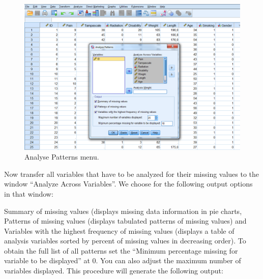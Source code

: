 \documentclass[]{book}
\theoremstyle{definition}
\theoremstyle{definition}
\theoremstyle{definition}
\theoremstyle{remark}
\begin{document}
\begin{figure}

{\centering \includegraphics[width=0.9\linewidth]{images/fig2.5} 

}

\caption{Analyse Patterns menu.}\label{fig:fig2-5}
\end{figure}

Now transfer all variables that have to be analyzed for their missing
values to the window ``Analyze Across Variables''. We choose for the
following output options in that window:

Summary of missing values (displays missing data information in pie
charts, Patterns of missing values (displays tabulated patterns of
missing values) and Variables with the highest frequency of missing
values (displays a table of analysis variables sorted by percent of
missing values in decreasing order). To obtain the full list of all
patterns set the ``Minimum percentage missing for variable to be
displayed'' at 0. You can also adjust the maximum number of variables
displayed. This procedure will generate the following output:
\end{document}

